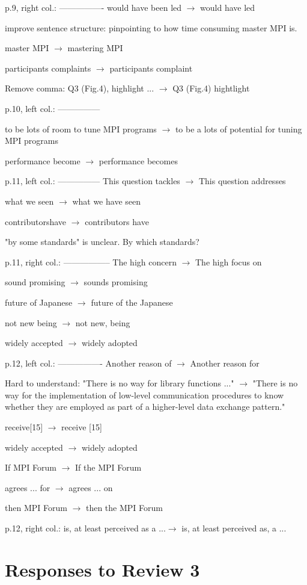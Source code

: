 \documentclass[11pt]{article}
\begin{document}
{p.9, right col.:
----------------
would have been led $\to$ would have led

improve sentence structure:
pinpointing to how time consuming master MPI is.

master MPI $\to$ mastering MPI

participants complaints $\to$ participants complaint

Remove comma:
Q3 (Fig.4), highlight ... $\to$ Q3 (Fig.4) hightlight

p.10, left col.:
---------------

to be lots of room to tune MPI programs $\to$
to be a lots of potential for tuning MPI programs

performance become $\to$ performance becomes

p.11, left col.:
---------------
This question tackles $\to$ This question addresses

what we seen $\to$ what we have seen

contributorshave $\to$ contributors have

"by some standards" is unclear. By which standards?

p.11, right col.:
-----------------
The high concern $\to$ The high focus on

sound promising $\to$ sounds promising

future of Japanese $\to$ future of the Japanese

not new being $\to$ not new, being

widely accepted $\to$ widely adopted

p.12, left col.:
----------------
Another reason of $\to$ Another reason for

Hard to understand:
"There is no way for library functions ..." $\to$
"There is no way for the implementation of low-level communication procedures
to know whether they are employed as part of a higher-level data exchange
pattern."

receive[15] $\to$ receive [15]

widely accepted $\to$ widely adopted

If MPI Forum $\to$ If the MPI Forum

agrees ... for $\to$ agrees ... on

then MPI Forum $\to$ then the MPI Forum

p.12, right col.:
is, at least perceived as a ...$\to$
is, at least perceived as, a ...
}

\section*{Responses to Review 3}
\end{document}
